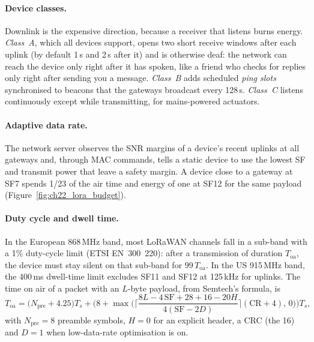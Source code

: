 \paragraph{Device classes.} Downlink is the expensive direction, because a receiver that listens
burns energy. \emph{Class~A}, which all devices support, opens two short receive windows after each
uplink (by default 1\,s and 2\,s after it) and is otherwise deaf: the network can reach the device only
right after it has spoken, like a friend who checks for replies only right after sending you a
message. \emph{Class~B} adds scheduled \emph{ping slots} synchronised to beacons that the gateways
broadcast every 128\,s. \emph{Class~C} listens continuously except while transmitting, for
mains-powered actuators.

\paragraph{Adaptive data rate.} The network server observes the SNR margins of a device's recent
uplinks at all gateways and, through MAC commands, tells a static device to use the lowest SF and
transmit power that leave a safety margin. A device close to a gateway at SF7 spends 1/23 of the air
time and energy of one at SF12 for the same payload (Figure~\ref{fig:ch22_lora_budget}).

\paragraph{Duty cycle and dwell time.} In the European 868\,MHz band, most LoRaWAN channels fall in a
sub-band with a 1\% duty-cycle limit (ETSI EN~300~220): after a transmission of duration
$T_{\text{oa}}$, the device must stay silent on that sub-band for $99\,T_{\text{oa}}$. In the US
915\,MHz band, the 400\,ms dwell-time limit excludes SF11 and SF12 at 125\,kHz for uplinks. The time on
air of a packet with an $L$-byte payload, from Semtech's formula, is
\begin{equation}
T_{\text{oa}}=\big(N_{\text{pre}}+4.25\big)T_s+\Big(8+\max\!\Big(\Big\lceil\frac{8L-4\,\text{SF}+28+16-20H}{4(\text{SF}-2D)}\Big\rceil(\text{CR}+4),\,0\Big)\Big)T_s,
\label{eq:ch22:toa}
\end{equation}
with $N_{\text{pre}}=8$ preamble symbols, $H=0$ for an explicit header, a CRC (the 16) and $D=1$ when
low-data-rate optimisation is on.


